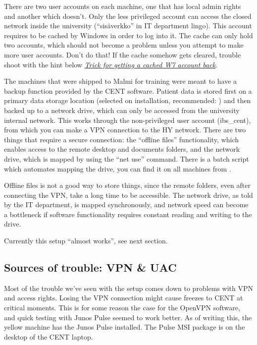 \documentclass[letterpaper,10pt,english]{sphinxmanual}
\begin{document}
There are two user accounts on each machine, one that has local admin rights and another which doesn't. Only the less privileged account can access the closed network inside the university (``sisäverkko'' in IT department lingo). This account requires to be cached by Windows in order to log into it. The cache can only hold two accounts, which should not become a problem unless you attempt to make more user accounts. Don't do that! If the cache somehow gets cleared, trouble shoot with the hint below {\hyperref[index:cached-acc-trick]{\emph{Trick for getting a cached W7 account back}}}.

The machines that were shipped to Malmi for training were meant to have a backup function provided by the CENT software. Patient data is stored first on a primary data storage location (selected on installation, recommended: ) and then backed up to a network drive, which can only be accessed from the university internal network. This works through the non-privileged user account (ibs\_cent), from which you can make a VPN connection to the HY network. There are two things that require a secure connection: the ``offline files'' functionality, which enables access to the remote desktop and documents folders, and the network drive, which is mapped by using the ``net use'' command. There is a batch script which automates mapping the drive, you can find it on all machines from .

Offline files is not a good way to store things, since the remote folders, even after connecting the VPN, take a long time to be accessible. The network drive, as told by the IT department, is mapped synchronously, and network speed can become a bottleneck if software functionality requires constant reading and writing to the drive.

Currently this setup ``almost works'', see next section.


\subsection{\textbf{Sources of trouble: VPN \& UAC}}
\label{index:sources-of-trouble-vpn-uac}
Most of the trouble we've seen with the setup comes down to problems with VPN and access rights. Losing the VPN connection might cause freezes to CENT at critical moments. This is for some reason the case for the OpenVPN software, and quick testing with Junos Pulse seemed to work better. As of writing this, the yellow machine has the Junos Pulse installed. The Pulse MSI package is on the desktop of the CENT laptop.
\end{document}
